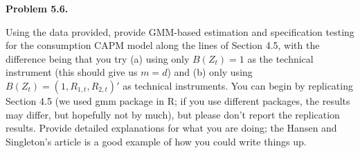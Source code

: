 \documentclass[11pt]{article}
\newenvironment{problem}[1]
    {\bigskip\noindent\textbf{Problem #1.}\par\setlength{\parindent}{0pt}}
    {\medskip}
\begin{document}
\newpage
\begin{problem}{5.6}
Using the data provided, provide GMM-based estimation and specification testing for the consumption CAPM model along the lines of Section 4.5, with the difference being that
you try (a) using only $B(Z_t) = 1$ as the technical instrument (this should give us $m = d$) and (b) only using $B(Z_t) = (1,R_{1,t},R_{2,t})'$ as technical instruments. You can begin by replicating Section 4.5 (we used gmm package in R; if you use different packages, the results may differ, but hopefully not by much), but please don’t report the replication results. Provide detailed explanations for what you are doing; the Hansen and Singleton’s article is a good example of how you could write things up.
\end{problem}
\end{document}
